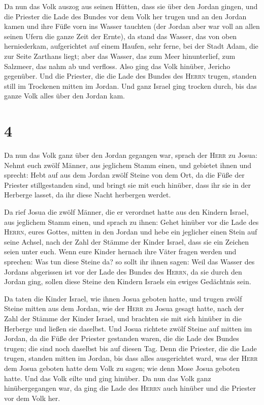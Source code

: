  Da nun das Volk auszog aus seinen Hütten, dass sie über
den Jordan gingen, und die Priester die Lade des Bundes vor dem Volk her
trugen  und an den Jordan kamen und ihre Füße vorn ins
Wasser tauchten (der Jordan aber war voll an allen seinen Ufern die
ganze Zeit der Ernte),  da stand das Wasser, das von oben
herniederkam, aufgerichtet auf einem Haufen, sehr ferne, bei der Stadt
Adam, die zur Seite Zarthans liegt; aber das Wasser, das zum Meer
hinunterlief, zum Salzmeer, das nahm ab und verfloss. Also ging das Volk
hinüber, Jericho gegenüber.  Und die Priester, die die
Lade des Bundes des \textsc{Herrn} trugen, standen still im Trockenen
mitten im Jordan. Und ganz Israel ging trocken durch, bis das ganze Volk
alles über den Jordan kam.

\hypertarget{section-3}{%
\section{4}\label{section-3}}

 Da nun das Volk ganz über den Jordan gegangen war, sprach
der \textsc{Herr} zu Josua:  Nehmt euch zwölf Männer, aus
jeglichem Stamm einen,  und gebietet ihnen und sprecht:
Hebt auf aus dem Jordan zwölf Steine von dem Ort, da die Füße der
Priester stillgestanden sind, und bringt sie mit euch hinüber, dass ihr
sie in der Herberge lasset, da ihr diese Nacht herbergen werdet.

 Da rief Josua die zwölf Männer, die er verordnet hatte
aus den Kindern Israel, aus jeglichem Stamm einen,  und
sprach zu ihnen: Gehet hinüber vor die Lade des \textsc{Herrn}, eures
Gottes, mitten in den Jordan und hebe ein jeglicher einen Stein auf
seine Achsel, nach der Zahl der Stämme der Kinder Israel, 
dass sie ein Zeichen seien unter euch. Wenn eure Kinder hernach ihre
Väter fragen werden und sprechen: Was tun diese Steine da?
 so sollt ihr ihnen sagen: Weil das Wasser des Jordans
abgerissen ist vor der Lade des Bundes des \textsc{Herrn}, da sie durch
den Jordan ging, sollen diese Steine den Kindern Israels ein ewiges
Gedächtnis sein.

 Da taten die Kinder Israel, wie ihnen Josua geboten
hatte, und trugen zwölf Steine mitten aus dem Jordan, wie der
\textsc{Herr} zu Josua gesagt hatte, nach der Zahl der Stämme der Kinder
Israel, und brachten sie mit sich hinüber in die Herberge und ließen sie
daselbst.  Und Josua richtete zwölf Steine auf mitten im
Jordan, da die Füße der Priester gestanden waren, die die Lade des
Bundes trugen; die sind noch daselbst bis auf diesen Tag.
 Denn die Priester, die die Lade trugen, standen mitten
im Jordan, bis dass alles ausgerichtet ward, was der \textsc{Herr} dem
Josua geboten hatte dem Volk zu sagen; wie denn Mose Josua geboten
hatte. Und das Volk eilte und ging hinüber.  Da nun das
Volk ganz hinübergegangen war, da ging die Lade des \textsc{Herrn} auch
hinüber und die Priester vor dem Volk her.

